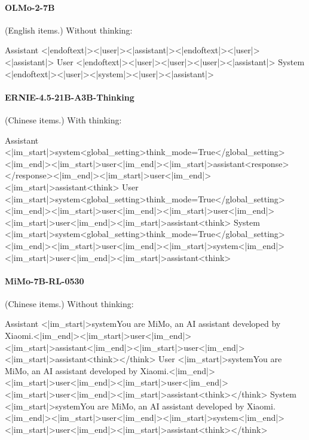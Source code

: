 \paragraph{OLMo-2-7B} (English items.)
\noindent Without thinking:
\begin{Rendering}
Assistant  <|endoftext|><|user|>\NL{}\NL{}<|assistant|>\NL{}<|endoftext|>\NL{}<|user|>\NL{}\NL{}<|assistant|>\NL{}
User       <|endoftext|><|user|>\NL{}\NL{}<|user|>\NL{}\NL{}<|user|>\NL{}\NL{}<|assistant|>\NL{}
System     <|endoftext|><|user|>\NL{}\NL{}<|system|>\NL{}\NL{}<|user|>\NL{}\NL{}<|assistant|>\NL{}
\end{Rendering}
\paragraph{ERNIE-4.5-21B-A3B-Thinking} (Chinese items.)
\noindent With thinking:
\begin{Rendering}
Assistant  <|im_start|>system\NL{}<global_setting>\NL{}think_mode=True\NL{}</global_setting><|im_end|>\NL{}\NL{}<|im_start|>user\NL{}<|im_end|>\NL{}\NL{}<|im_start|>assistant\NL{}<response>\NL{}\NL{}</response>\NL{}<|im_end|>\NL{}\NL{}<|im_start|>user\NL{}<|im_end|>\NL{}\NL{}<|im_start|>assistant\NL{}<think>\NL{}
User       <|im_start|>system\NL{}<global_setting>\NL{}think_mode=True\NL{}</global_setting><|im_end|>\NL{}\NL{}<|im_start|>user\NL{}<|im_end|>\NL{}\NL{}<|im_start|>user\NL{}<|im_end|>\NL{}\NL{}<|im_start|>user\NL{}<|im_end|>\NL{}\NL{}<|im_start|>assistant\NL{}<think>\NL{}
System     <|im_start|>system\NL{}<global_setting>\NL{}think_mode=True\NL{}</global_setting><|im_end|>\NL{}\NL{}<|im_start|>user\NL{}<|im_end|>\NL{}\NL{}<|im_start|>system\NL{}<|im_end|>\NL{}\NL{}<|im_start|>user\NL{}<|im_end|>\NL{}\NL{}<|im_start|>assistant\NL{}<think>\NL{}
\end{Rendering}
\paragraph{MiMo-7B-RL-0530} (Chinese items.)
\noindent Without thinking:
\begin{Rendering}
Assistant  <|im_start|>system\NL{}You are MiMo, an AI assistant developed by Xiaomi.<|im_end|>\NL{}<|im_start|>user\NL{}<|im_end|>\NL{}<|im_start|>assistant\NL{}<|im_end|>\NL{}<|im_start|>user\NL{}<|im_end|>\NL{}<|im_start|>assistant\NL{}<think>\NL{}\NL{}</think>\NL{}
User       <|im_start|>system\NL{}You are MiMo, an AI assistant developed by Xiaomi.<|im_end|>\NL{}<|im_start|>user\NL{}<|im_end|>\NL{}<|im_start|>user\NL{}<|im_end|>\NL{}<|im_start|>user\NL{}<|im_end|>\NL{}<|im_start|>assistant\NL{}<think>\NL{}\NL{}</think>\NL{}
System     <|im_start|>system\NL{}You are MiMo, an AI assistant developed by Xiaomi.<|im_end|>\NL{}<|im_start|>user\NL{}<|im_end|>\NL{}<|im_start|>system\NL{}<|im_end|>\NL{}<|im_start|>user\NL{}<|im_end|>\NL{}<|im_start|>assistant\NL{}<think>\NL{}\NL{}</think>\NL{}
\end{Rendering}
